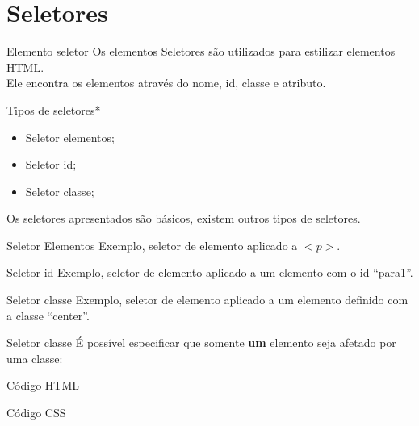 \documentclass{beamer}
\begin{document}
\section{Seletores}
\begin{frame}{Elemento seletor}
  Os elementos Seletores são utilizados para estilizar elementos HTML.\\
  Ele encontra os elementos através do nome, id, classe e atributo.
  \begin{block}{Tipos de seletores*}
    \begin{itemize}
      \item Seletor elementos;
      \item Seletor id;
      \item Seletor classe;
    \end{itemize}
 \tiny *Os seletores apresentados são básicos, existem outros tipos de 
seletores.
  \end{block}
\end{frame}
\begin{frame}{Seletor Elementos}
Exemplo, seletor de elemento aplicado a $<p>$.
  \begin{center}
    
  \end{center}
\end{frame}
\begin{frame}{Seletor id}
Exemplo, seletor de elemento aplicado a um elemento com o id ``para1''.
  \begin{center}
    
  \end{center}
\end{frame}
\begin{frame}{Seletor classe}
Exemplo, seletor de elemento aplicado a um elemento definido com a classe ``center''.
  \begin{center}
    
  \end{center}
\end{frame}
\begin{frame}{Seletor classe}
É possível especificar que somente \textbf{um} elemento seja afetado por uma classe:
    \begin{center}
      
      \tiny Código HTML
    \end{center}
  \begin{center}
    
    \tiny Código CSS
  \end{center}
\end{frame}
\end{document}
